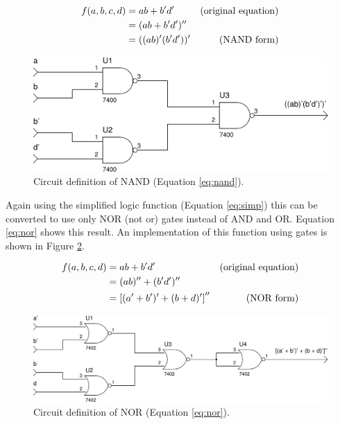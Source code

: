 \documentclass[12pt]{article}
\begin{document}
\begin{align}
f(a,b,c,d) &= a b + b'd' &\mbox{(original equation)} \notag \\
	&= (a b + b'd')'' \notag \\
	&= ((ab)' (b'd'))' &\mbox{(NAND form)} \label{eq:nand}
\end{align}

\begin{figure}[!hbtp]
\center
\includegraphics[scale=0.5]{nand-01}
\caption{Circuit definition of NAND (Equation \ref{eq:nand}).}
\label{fig:nand}
\end{figure}

Again using the simplified logic function (Equation \ref{eq:simp}) this
can be converted to use only NOR (not or) gates instead of AND and OR.
Equation \ref{eq:nor} shows this result.
An implementation of this function using gates is shown in Figure \ref{fig:nor}.

\begin{align}
f(a,b,c,d) &= a b + b'd' &\mbox{(original equation)} \notag \\
	&= (a b)'' + (b'd')'' \notag \\
	&= \left[ (a' + b')' + (b + d)' \right]'' &\mbox{(NOR form)} \label{eq:nor}
\end{align}

\begin{figure}[!hbtp]
\center
\includegraphics[scale=0.5]{nor-01}
\caption{Circuit definition of NOR (Equation \ref{eq:nor}).}
\label{fig:nor}
\end{figure}

\clearpage
\end{document}
